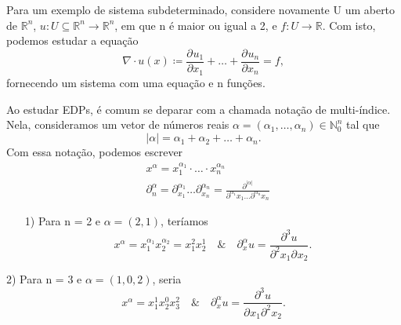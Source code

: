 \documentclass[../pde_notes.tex]{subfiles}
\begin{document}
\begin{example}
	Para um exemplo de sistema subdeterminado, considere novamente U um aberto de \(\mathbb{R}^{n}\), \(u:U\subseteq \mathbb{R}^{n}\rightarrow \mathbb{R}^{n}\), em que n é maior ou igual a 2, e \(f:U\rightarrow \mathbb{R}\). Com isto, podemos estudar a equação
	\[
		\nabla \cdot u(x)\coloneqq \frac{\partial^{}u_{1}}{\partial x_{1}^{}} +\dotsc +\frac{\partial^{}u_{n}}{\partial x_{n}^{}} = f,
	\]
	fornecendo um sistema com uma equação e n funções.
\end{example}

Ao estudar EDPs, é comum se deparar com a chamada notação de multi-índice. Nela, consideramos um vetor de números reais \(\alpha = (\alpha_{1}, \dotsc , \alpha_{n})\in \mathbb{N}_{0}^{n}\) tal que
\[
	|\alpha | = \alpha_{1} + \alpha_{2} + \dotsc + \alpha_{n}.
\]
Com essa notação, podemos escrever
\begin{align*}
	 & x^{\alpha } = x_{1}^{\alpha_{1}}\cdot  \dotsc \cdot x_{n}^{\alpha_{n}}                                                                                                                      \\
	 & \partial^{\alpha }_{n} = \partial^{\alpha_{1}}_{x_{1}}\dotsc \partial^{\alpha_{n}}_{x_{n}} = \frac{\partial^{|\alpha |}}{\partial_{}^{\alpha_{1}}x_{1}\dotsc \partial^{\alpha_{n}}_{}x_{n}}
\end{align*}
\begin{example}
	\begin{itemize}
		\item[1)] Para n = 2 e \(\alpha = (2, 1)\), teríamos
		      \[
			      x^{\alpha } = x_{1}^{\alpha_{1}}x_{2}^{\alpha_{2}} = x_{1}^{2}x_{2}^{1} \quad\&\quad \partial_{x}^{\alpha }u = \frac{\partial^{3}u}{\partial^{2}x_{1}\partial^{}_{}x_{2}}.
		      \]
	\end{itemize}
	\item[2)] Para n = 3 e \(\alpha = (1, 0, 2)\), seria
	\[
		x^{\alpha } = x_{1}^{1}x_{2}^{0}x_{3}^{2} \quad\&\quad \partial_{x}^{\alpha }u = \frac{\partial^{3}u}{\partial^{}x_{1}\partial^{2}_{}x_{2}}.
	\]
\end{example}
\end{document}
